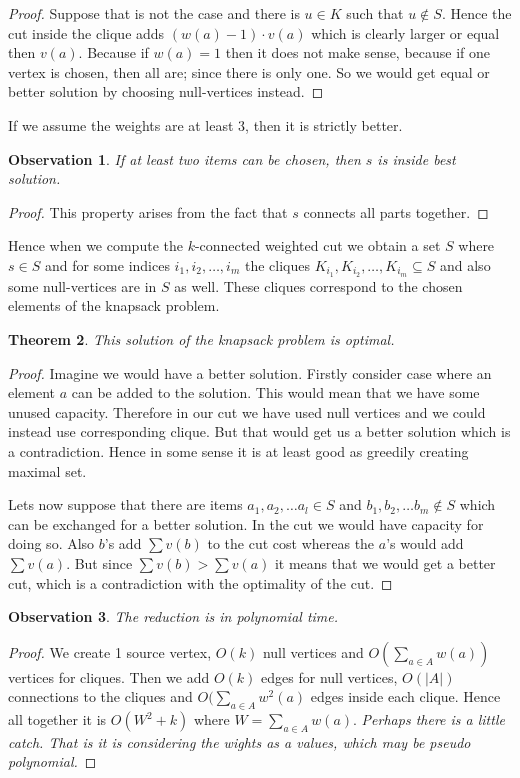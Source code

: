 \documentclass{article}
\theoremstyle{plain}
\newtheorem{thm}{Theorem}
\newtheorem{observ}[thm]{Observation}
\theoremstyle{plain}
\theoremstyle{remark}
\begin{document}
	\begin{proof}
		Suppose that is not the case and there is $u \in K$ such that $u \notin S$. Hence the cut inside the clique adds $(w(a)-1) \cdot v(a)$ which is clearly larger or equal then $v(a)$. Because if $w(a) = 1$ then it does not make sense, because if one vertex is chosen, then all are; since there is only one. So we would get equal or better solution by choosing null-vertices instead.
	\end{proof}

	If we assume the weights are at least 3, then it is strictly better.
	
	\begin{observ}
		If at least two items can be chosen, then $s$ is inside best solution.
	\end{observ}

	\begin{proof}
		This property arises from the fact that $s$ connects all parts together.
	\end{proof}

	Hence when we compute the $k$-connected weighted cut we obtain a set $S$ where $s \in S$ and for some indices $i_1, i_2, \dots, i_m$ the cliques $K_{i_1}, K_{i_2}, \dots, K_{i_m} \subseteq S$ and also some null-vertices are in $S$ as well. These cliques correspond to the chosen elements of the knapsack problem.
	
	\begin{thm}
		This solution of the knapsack problem is optimal.
	\end{thm}

	\begin{proof}
		Imagine we would have a better solution. Firstly consider case where an element $a$ can be added to the solution. This would mean that we have some unused capacity. Therefore in our cut we have used null vertices and we could instead use corresponding clique. But that would get us a better solution which is a contradiction. Hence in some sense it is at least good as greedily creating maximal set.
		
		Lets now suppose that there are items $a_1, a_2, \dots a_l \in S$ and $b_1, b_2, \dots b_m \notin S$ which can be exchanged for a better solution. In the cut we would have capacity for doing so. Also $b$'s add $\sum v(b)$ to the cut cost whereas the $a$'s would add $\sum v(a)$. But since $\sum v(b) > \sum v(a)$ it means that we would get a better cut, which is a contradiction with the optimality of the cut.
	\end{proof}

	\begin{observ}
		The reduction is in polynomial time.
	\end{observ}

	\begin{proof}
		We create 1 source vertex, $O(k)$ null vertices and $O(\sum_{a \in A} w(a))$ vertices for cliques. Then we add $O(k)$ edges for null vertices, $O(|A|)$ connections to the cliques and $O(\sum_{a \in A} w^2(a)$ edges inside each clique. Hence all together it is $O(W^2 + k)$ where $W = \sum_{a \in A} w(a)$. \textit{Perhaps there is a little catch. That is it is considering the wights as a values, which may be pseudo polynomial.}
	\end{proof}	
\end{document}
